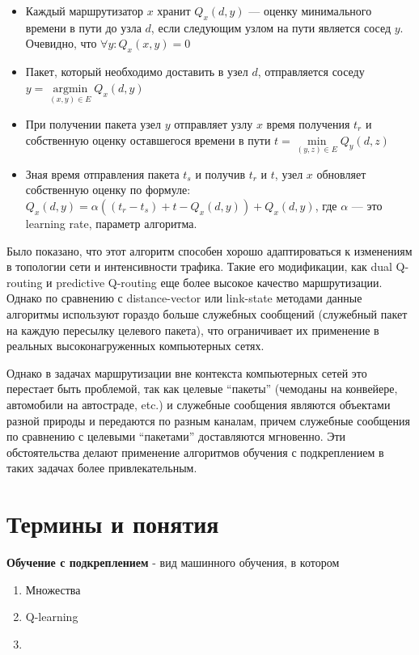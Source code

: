 \documentclass[]{itmo-student-thesis}
\DeclareMathOperator{\argmin}{argmin}
\begin{document}
\begin{itemize}
\item Каждый маршрутизатор $x$ хранит $Q_x(d, y)$ --- оценку минимального
  времени в пути до узла $d$, если следующим узлом на пути является сосед $y$.
  Очевидно, что $\forall y : Q_x(x, y) = 0$ 
\item Пакет, который необходимо доставить в узел $d$, отправляется соседу
  $y = \argmin\limits_{(x, y) \in E} Q_x(d, y)$
\item При получении пакета узел $y$ отправляет узлу $x$ время получения $t_r$ и
  собственную оценку оставшегося времени в пути
  $t = \min\limits_{(y, z) \in E} Q_y(d, z)$
\item Зная время отправления пакета $t_s$ и получив $t_r$ и $t$, узел $x$
  обновляет собственную оценку по формуле:
  $Q_x(d, y) = \alpha((t_r - t_s) + t - Q_x(d, y)) + Q_x(d, y)$,
  где $\alpha$ --- это learning rate, параметр алгоритма.
\end{itemize}

Было показано, что этот алгоритм способен хорошо адаптироваться к изменениям в
топологии сети и интенсивности трафика. Такие его модификации, как dual
Q-routing и predictive Q-routing еще более высокое качество маршрутизации.
Однако по сравнению с distance-vector или link-state методами данные алгоритмы
используют гораздо больше служебных сообщений (служебный пакет на каждую
пересылку целевого пакета), что ограничивает их применение в реальных
высоконагруженных компьютерных сетях. 

Однако в задачах маршрутизации вне контекста компьютерных сетей это перестает
быть проблемой, так как целевые ``пакеты'' (чемоданы на конвейере, автомобили на
автостраде, etc.) и служебные сообщения являются объектами разной природы и
передаются по разным каналам, причем служебные сообщения по сравнению с целевыми
``пакетами'' доставляются мгновенно. Эти обстоятельства делают применение
алгоритмов обучения с подкреплением в таких задачах более привлекательным.



\section{Термины и понятия}

\textbf{Обучение с подкреплением} - вид машинного обучения, в котором \textit{}

\begin{enumerate}
\item Множества 
\item Q-learning 
\item 
\end{enumerate}
\end{document}
